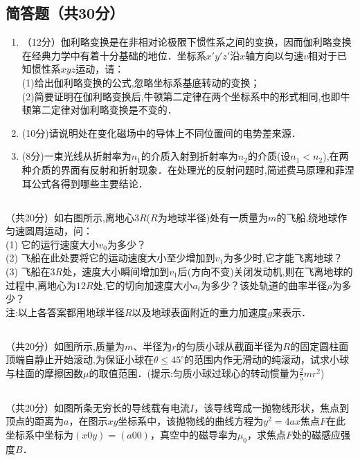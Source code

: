 \subsection{简答题（共30分）}
\begin{enumerate}
\item （12分）伽利略变换是在非相对论极限下惯性系之间的变换，因而伽利略变换在经典力学中有着十分基础的地位．坐标系$x'y'z'$沿$x$轴方向以匀速$v$相对于已知惯性系$xyz$运动，请：\\
(1)给出伽利略变换的公式,忽略坐标系基底转动的变换；\\
(2)简要证明在伽利略变换后,牛顿第二定律在两个坐标系中的形式相同,也即牛顿第二定律对伽利略变换是不变的．\\

\item (10分)请说明处在变化磁场中的导体上不同位置间的电势差来源．

\item (8分)一束光线从折射率为$n_{1}$的介质入射到折射率为$n_{2}$的介质(设$n_{1}<n_{2}$),在两种介质的界面有反射和折射现象．在处理光的反射问题时,简述费马原理和菲涅耳公式各得到哪些主要结论．
\end{enumerate}
\subsection{ }
（共20分）如右图所示,离地心$3R$($R$为地球半径)处有一质量为$m$的飞船,绕地球作匀速圆周运动，问：\\
(1) 它的运行速度大小$v_{0}$为多少？\\
(2) 飞船在此处要将它的运动速度大小至少增加到$v_{1}$为多少时,它才能飞离地球？\\
(3) 飞船在$3R$处，速度大小瞬间增加到$v_{1}$后(方向不变)关闭发动机,则在飞离地球的过程中,离地心为$12R$处,它的切向加速度大小$a_{t}$为多少？该处轨道的曲率半径$\rho$为多少？\\
注:以上各答案都用地球半径$R$以及地球表面附近的重力加速度$g$来表示．

\subsection{ }
（共20分）如图所示,质量为$m$、半径为$r$的匀质小球从截面半径为$R$的固定圆柱面顶端自静止开始滚动,为保证小球在$\theta \le 45^{\circ}$的范围内作无滑动的纯滚动，试求小球与柱面的摩擦因数$\mu$的取值范围．(提示:匀质小球过球心的转动惯量为$\frac{2}{5} mr^{2}$)

\subsection{ }
（共20分）如图所条无穷长的导线载有电流$I$，该导线弯成一抛物线形状，焦点到顶点的距离为$a$，在图示$xy$坐标系中，该抛物线的曲线方程为$y^{2}=4ax$焦点$F$在此坐标系中坐标为$(x0y)=(a00)$，真空中的磁导率为$\mu_{0}$，求焦点$F$处的磁感应强度$B$．

